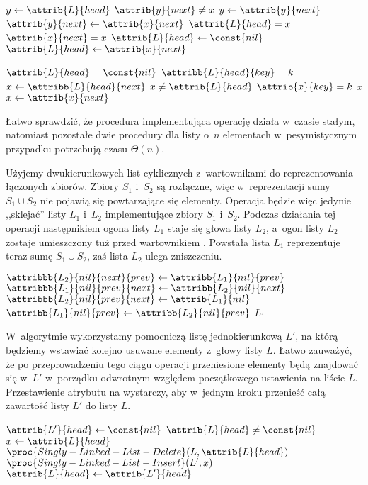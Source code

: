 \begin{codebox}
\li	$y\gets\attrib{L}{head}$
\li	\While $\attrib{y}{next}\ne x$
\li		\Do $y\gets\attrib{y}{next}$
		\End
\li	$\attrib{y}{next}\gets\attrib{x}{next}$
\li	\If $\attrib{L}{head}=x$
\li		\Then \If $\attrib{x}{next}=x$
\li				\Then $\attrib{L}{head}\gets\const{nil}$
\li				\Else $\attrib{L}{head}\gets\attrib{x}{next}$
				\End
		\End
\end{codebox}

\begin{codebox}
\li	\If $\attrib{L}{head}=\const{nil}$
\li		\Then \Return {}
		\End
\li	\If $\attribb{L}{head}{key}=k$
\li		\Then \Return {}
		\End
\li	$x\gets\attribb{L}{head}{next}$
\li	\While $x\ne\attrib{L}{head}$
\li		\Do \If $\attrib{x}{key}=k$
\li				\Then \Return $x$
				\End
\li			$x\gets\attrib{x}{next}$
		\End
\li	\Return {}
\end{codebox}

Łatwo sprawdzić, że procedura implementująca operację  działa w~czasie stałym, natomiast pozostałe dwie procedury dla listy o~$n$ elementach w~pesymistycznym przypadku potrzebują czasu $\Theta(n)$.

\exercise %
Użyjemy dwukierunkowych list cyklicznych z~wartownikami do reprezentowania łączonych zbiorów.
Zbiory $S_1$ i~$S_2$ są rozłączne, więc w~reprezentacji sumy $S_1\cup S_2$ nie pojawią się powtarzające się elementy.
Operacja  będzie więc jedynie ,,sklejać'' listy $L_1$ i~$L_2$ implementujące zbiory $S_1$ i~$S_2$.
Podczas działania tej operacji następnikiem ogona listy $L_1$ staje się głowa listy $L_2$, a~ogon listy $L_2$ zostaje umieszczony tuż przed wartownikiem .
Powstała lista $L_1$ reprezentuje teraz sumę $S_1\cup S_2$, zaś lista $L_2$ ulega zniszczeniu.
\begin{codebox}
\li	$\attribbb{L_2}{nil}{next}{prev}\gets\attribb{L_1}{nil}{prev}$
\li	$\attribbb{L_1}{nil}{prev}{next}\gets\attribb{L_2}{nil}{next}$
\li	$\attribbb{L_2}{nil}{prev}{next}\gets\attrib{L_1}{nil}$
\li	$\attribb{L_1}{nil}{prev}\gets\attribb{L_2}{nil}{prev}$
\li	\Return $L_1$
\end{codebox}

\exercise %
W~algorytmie wykorzystamy pomocniczą listę jednokierunkową $L'$, na którą będziemy wstawiać kolejno usuwane elementy z~głowy listy $L$.
Łatwo zauważyć, że po przeprowadzeniu tego ciągu operacji przeniesione elementy będą znajdować się w~$L'$ w~porządku odwrotnym względem początkowego ustawienia na liście $L$.
Przestawienie atrybutu  na  wystarczy, aby w~jednym kroku przenieść całą zawartość listy $L'$ do listy $L$.
\begin{codebox}
\li	$\attrib{L'}{head}\gets\const{nil}$
\li	\While $\attrib{L}{head}\ne\const{nil}$
\li		\Do $x\gets\attrib{L}{head}$
\li			$\proc{Singly-Linked-List-Delete}(L,\attrib{L}{head})$
\li			$\proc{Singly-Linked-List-Insert}(L',x)$
		\End
\li	$\attrib{L}{head}\gets\attrib{L'}{head}$
\end{codebox}

